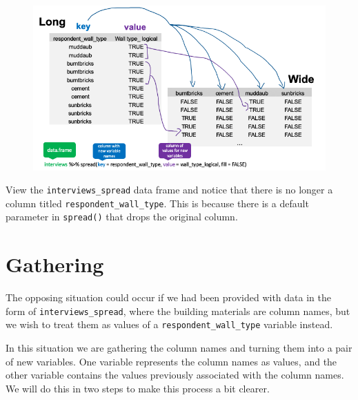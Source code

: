 \documentclass[]{book}
\newenvironment{Shaded}{\begin{snugshade}}{\end{snugshade}}
\newcommand{\KeywordTok}[1]{\textcolor[rgb]{0.13,0.29,0.53}{\textbf{#1}}}
\newcommand{\DataTypeTok}[1]{\textcolor[rgb]{0.13,0.29,0.53}{#1}}
\newcommand{\StringTok}[1]{\textcolor[rgb]{0.31,0.60,0.02}{#1}}
\newcommand{\OtherTok}[1]{\textcolor[rgb]{0.56,0.35,0.01}{#1}}
\newcommand{\OperatorTok}[1]{\textcolor[rgb]{0.81,0.36,0.00}{\textbf{#1}}}
\newcommand{\NormalTok}[1]{#1}
\begin{document}
\begin{Shaded}
\end{Shaded}

\begin{figure}
\centering
\includegraphics{./fig/long_to_wide.png}
\caption{}
\end{figure}

View the \texttt{interviews\_spread} data frame and notice that there is
no longer a column titled \texttt{respondent\_wall\_type}. This is
because there is a default parameter in \texttt{spread()} that drops the
original column.

\section{Gathering}\label{gathering}

The opposing situation could occur if we had been provided with data in
the form of \texttt{interviews\_spread}, where the building materials
are column names, but we wish to treat them as values of a
\texttt{respondent\_wall\_type} variable instead.

In this situation we are gathering the column names and turning them
into a pair of new variables. One variable represents the column names
as values, and the other variable contains the values previously
associated with the column names. We will do this in two steps to make
this process a bit clearer.
\end{document}
